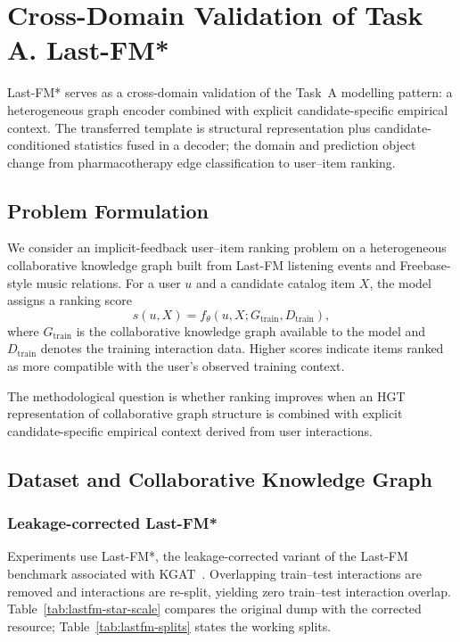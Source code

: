\chapter{Cross-Domain Validation of Task A. Last-FM*}
\label{ch:lastfm-proxy}
\label{ch:lastfm-ewaluacja}
\label{ch:lastfm-benchmark}

Last-FM* serves as a cross-domain validation of the Task~A modelling pattern: a heterogeneous graph encoder combined with explicit candidate-specific empirical context.
The transferred template is structural representation plus candidate-conditioned statistics fused in a decoder; the domain and prediction object change from pharmacotherapy edge classification to user--item ranking.

\section{Problem Formulation}
\label{sec:lastfm-problem}

We consider an implicit-feedback user--item ranking problem on a heterogeneous collaborative knowledge graph built from Last-FM listening events and Freebase-style music relations.
For a user $u$ and a candidate catalog item $X$, the model assigns a ranking score
\begin{equation}
\label{eq:lastfm-score}
s(u,X)=f_{\theta}(u,X;G_{\mathrm{train}},D_{\mathrm{train}}),
\end{equation}
where $G_{\mathrm{train}}$ is the collaborative knowledge graph available to the model and $D_{\mathrm{train}}$ denotes the training interaction data.
Higher scores indicate items ranked as more compatible with the user's observed training context.

The methodological question is whether ranking improves when an HGT representation of collaborative graph structure is combined with explicit candidate-specific empirical context derived from user interactions.

\section{Dataset and Collaborative Knowledge Graph}
\label{sec:lastfm-data}

\subsection{Leakage-corrected Last-FM*}
\label{sec:lastfm-data-star}

Experiments use Last-FM*, the leakage-corrected variant of the Last-FM benchmark associated with KGAT~\cite{wang2019kgat,shehzad2025lastfm}.
Overlapping train--test interactions are removed and interactions are re-split, yielding zero train--test interaction overlap.
Table~\ref{tab:lastfm-star-scale} compares the original dump with the corrected resource; Table~\ref{tab:lastfm-splits} states the working splits.

